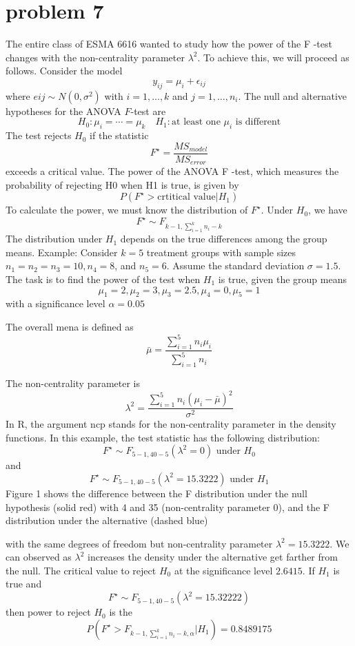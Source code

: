 \documentclass{article}
\begin{document}
\section{problem 7}
The entire class of ESMA 6616 wanted to study how the power of the F -test changes with the
non-centrality parameter $\lambda^2$. To achieve this, we will proceed as follows. Consider the model
$$
	y_{ij}= \mu_i + \epsilon_{ij}
$$
where $e{ij} \sim N(0,\sigma^2)$ with $i=1,\ldots,k$ and $j=1,\ldots,n_i$.
The null and alternative hypotheses for the ANOVA $F$-test are
$$
	H_0:\mu_i=\cdots=\mu_k \quad H_1: \text{at least one  $\mu_i$ is different}
$$
The test rejects $H_0$ if the statistic
$$
	F^\star = \frac{MS_{model}}{MS_{error}}
$$
exceeds a critical value.
The power of the ANOVA F -test, which measures the probability of rejecting H0 when H1 is true,
is given by
$$
	P(F^\star>\text{crtitical value}| H_1)
$$
To calculate the power, we must know the distribution of $F^\star$. Under $H_0$, we have
$$
	F^\star \sim F_{k-1,\sum_{i=1}^{k}n_i-k}
$$
The distribution under $H_1$ depends on the true differences among the group means.
Example: Consider $k = 5$ treatment groups with sample sizes $n_1 = n_2 = n_3 = 10, n_4 = 8$, and
$n_5 = 6$. Assume the standard deviation $\sigma = 1.5$. The task is to find the power of the test when $H_1$
is true, given the group means
$$
	\mu_1 = 2, \mu_2 = 3, \mu_3 = 2.5, \mu_4 =0, \mu_5 = 1
$$
with a significance level $\alpha = 0.05$

The overall mena is defined as
$$
	\bar{\mu}= \frac{\sum_{i=1}^{5}n_i \mu_i}{\sum_{i=1}^{5}n_i}
$$

The non-centrality parameter is
$$
	\lambda^2 = \frac{\sum_{i=1}^{5}n_i(\mu_i-\bar{\mu})^2}{\sigma^2}
$$
In R, the argument ncp stands for the non-centrality parameter in the density functions. In this
example, the test statistic has the following distribution:
$$
	F^\star \sim F_{5-1,40-5}(\lambda^2=0) \text{ under } H_0
$$
and
$$
	F^\star \sim F_{5-1,40-5}(\lambda^2=15.3222) \text{ under } H_1
$$
Figure 1 shows the difference between the F distribution under the null hypothesis (solid red) with
4 and 35 (non-centrality parameter 0), and the F distribution under the alternative (dashed blue)

with the same degrees of freedom but non-centrality parameter $\lambda^2 = 15.3222$. We can observed as $\lambda^2$
increases the density under the alternative get farther from the null. The critical value to reject $H_0$
at the significance level $2.6415$. If $H_1$ is true and
$$
	F^\star \sim F_{5-1,40-5}(\lambda^2 = 15.32222)
$$
then power to reject $H_0$ is the
$$
	P(F^\star>F_{k-1,\sum_{i=1}^{k}n_i-k,\alpha}|H_1)=0.8489175
$$
\end{document}
